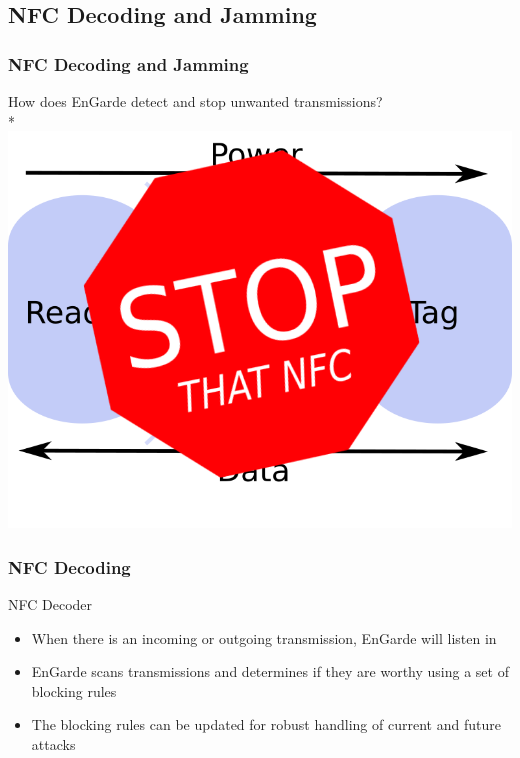 \documentclass[unknownkeysallowed]{beamer}
\begin{document}


\subsection{NFC Decoding and Jamming}
\begin{frame}
\frametitle{NFC Decoding and Jamming}
\begin{center}
  \vspace{3mm}
  {\large \textcolor{uipoppy}{How does EnGarde detect and stop unwanted transmissions?}}\\*
  \pause
  \vspace{4mm}
   \includegraphics[width=.5\linewidth,height=\textheight,keepaspectratio]{figures/stop.png}
\end{center}
\end{frame}


\begin{frame}
\frametitle{NFC Decoding}
  \begin{center}
  \begin{minipage}{.9\textwidth}
  \begin{block}{NFC Decoder}
    \begin{itemize}
      \item{When there is an incoming or outgoing transmission, EnGarde will listen in}
      \pause
      \vspace{1mm}
      \item{EnGarde scans transmissions and determines if they are worthy using a set of blocking rules}
      \pause
      \vspace{1mm}
      \item{The blocking rules can be updated for robust handling of current and future attacks}
    \end{itemize}
  \end{block}
  \end{minipage}
  \end{center}
\end{frame}
\end{document}
